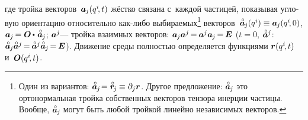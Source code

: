 \begin{otherlanguage}{russian}
\vspace{-0.1em} \noindent где тройка векторов~${\bm{a}_{\hspace{-0.12ex}j}(q^i\hspace{-0.4ex}, t)}$ жёстко связана с~каждой частицей, показывая угловую ориентацию относительно как\hbox{-}либо выбираемых\footnote{Один из вариантов: ${\mathcircabove{\bm{a}}_{\hspace{-0.12ex}j} \hspace{-0.4ex} = \initialvector_{\hspace{-0.2ex}j} \hspace{-0.1ex} \equiv \partial_j \currentvector}$.
Другое предложение: ${\mathcircabove{\bm{a}}_{\hspace{-0.12ex}j} \hspace{-0.2ex}}$ это ортонормальная тройка собственных векторов тензора инерции частицы. %
Вообще, ${\mathcircabove{\bm{a}}_{\hspace{-0.12ex}j} \hspace{-0.2ex}}$ могут быть любой тройкой линейно независимых векторов.}\hspace{-0.25ex}
векторов~${\mathcircabove{\bm{a}}_{\hspace{-0.12ex}j}(q^i) \equiv \bm{a}_{\hspace{-0.12ex}j}(q^i\hspace{-0.4ex}, 0)}$,
${\bm{a}_{\hspace{-0.12ex}j} \hspace{-0.2ex} = \rotationtensor \hspace{-0.1ex} \dotp \hspace{.2ex} \mathcircabove{\bm{a}}_{\hspace{-0.12ex}j}}$;
${\bm{a}^j\hspace{-0.2ex}}$\:--- тройка взаимных векторов:
${\bm{a}_{\hspace{-0.12ex}j} \bm{a}^j \hspace{-0.25ex} = \hspace{-0.15ex} \bm{a}^j \bm{a}_{\hspace{-0.12ex}j} \hspace{-0.25ex} = \hspace{-0.2ex} \bm{E}}$
(${t\!=\!0}$, ${\mathcircabove{\bm{a}}^j}$: ${\mathcircabove{\bm{a}}_{\hspace{-0.12ex}j} \mathcircabove{\bm{a}}^j \hspace{-0.25ex} = \hspace{-0.15ex} \mathcircabove{\bm{a}}^j \mathcircabove{\bm{a}}_{\hspace{-0.12ex}j} \hspace{-0.25ex} = \hspace{-0.2ex} \bm{E}}$).
Движение среды полностью определяется функциями ${\bm{r}(q^i\hspace{-0.4ex}, t)}$ и~${\bm{O}(q^i\hspace{-0.4ex}, t)}$.


\end{otherlanguage}
